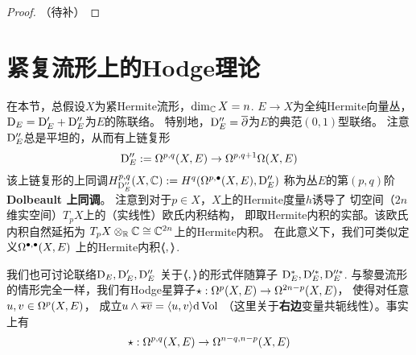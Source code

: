 \begin{proof}
{\color{red}（待补）}
\end{proof}

\section{紧复流形上的Hodge理论}

在本节，总假设$X$为紧Hermite流形，$\dim_{\mathbb{C}}X=n$.
$E\to X$为全纯Hermite向量丛，
$\mathrm{D}_E=\mathrm{D}_E'+\mathrm{D}_E''$为$E$的陈联络。
特别地，$\mathrm{D}_E''=\overline{\partial}$为$E$的典范$(0,1)$型联络。
注意$\mathrm{D}_{E}''$总是平坦的，从而有上链复形
$$
  \mathrm{D}_{E}'':=\Omega^{p,q}(X,E)
  \to\Omega^{p,q+1}\Omega(X,E)
$$
该上链复形的上同调$H^{p,q}_{\mathrm{D}_E''}(X,\mathbb{C})
:=H^q(\Omega^{p,\bullet}(X,E),\mathrm{D}_E'')$
称为丛$E$的第$(p,q)$阶\textbf{Dolbeault 上同调}。
注意到对于$p\in X$，$X$上的Hermite度量$h$诱导了
切空间（$2n$维实空间）$T_pX$上的（实线性）欧氏内积结构，
即取Hermite内积的实部。该欧氏内积自然延拓为
$T_pX\otimes_{\mathbb{R}}\mathbb{C}\cong\mathbb{C}^{2n}$上的Hermite内积。
在此意义下，我们可类似定义$\Omega^{\bullet,\bullet}(X,E)$
上的Hermite内积$\langle\!\! \langle , \rangle\!\! \rangle$.

我们也可讨论联络$\mathrm{D}_E,\mathrm{D}_E',\mathrm{D}_E''$
关于$\langle\!\! \langle , \rangle\!\! \rangle$的形式伴随算子
$\mathrm{D}_E^*,\mathrm{D}_E'^{*},\mathrm{D}_E''^{*}$.
与黎曼流形的情形完全一样，我们有Hodge星算子$\star:\Omega^p(X,E)\to\Omega^{2n-p}(X,E)$，
使得对任意$u,v\in\Omega^{p}(X,E)$，
成立$u\wedge\overline{\star v}=\langle u,v \rangle\mathrm{d}\operatorname{Vol}$
（{\color{blue}这里关于\textbf{右边}变量共轭线性}）。事实上有
$$\star:\Omega^{p,q}(X,E)\to\Omega^{n-q,n-p}(X,E)$$


